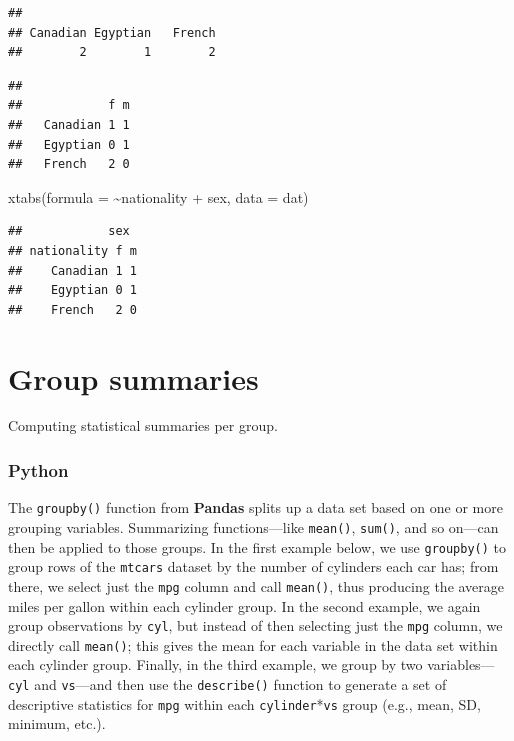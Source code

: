 \documentclass[
]{book}
\newenvironment{Shaded}{\begin{snugshade}}{\end{snugshade}}
\newcommand{\AttributeTok}[1]{\textcolor[rgb]{0.77,0.63,0.00}{#1}}
\newcommand{\FunctionTok}[1]{\textcolor[rgb]{0.00,0.00,0.00}{#1}}
\newcommand{\NormalTok}[1]{#1}
\newcommand{\SpecialCharTok}[1]{\textcolor[rgb]{0.00,0.00,0.00}{#1}}
\begin{document}
\begin{verbatim}
## 
## Canadian Egyptian   French 
##        2        1        2
\end{verbatim}

\begin{Shaded}
\end{Shaded}

\begin{verbatim}
##           
##            f m
##   Canadian 1 1
##   Egyptian 0 1
##   French   2 0
\end{verbatim}

\begin{Shaded}
\begin{Highlighting}[]
\FunctionTok{xtabs}\NormalTok{(}\AttributeTok{formula =} \SpecialCharTok{\textasciitilde{}}\NormalTok{nationality }\SpecialCharTok{+}\NormalTok{ sex, }\AttributeTok{data =}\NormalTok{ dat)}
\end{Highlighting}
\end{Shaded}

\begin{verbatim}
##            sex
## nationality f m
##    Canadian 1 1
##    Egyptian 0 1
##    French   2 0
\end{verbatim}

\hypertarget{group-summaries}{%
\section{Group summaries}\label{group-summaries}}

Computing statistical summaries per group.

\hypertarget{python-39}{%
\subsubsection*{Python}\label{python-39}}

The \texttt{groupby()} function from \textbf{Pandas} splits up a data set based on one or more grouping variables. Summarizing functions---like \texttt{mean()}, \texttt{sum()}, and so on---can then be applied to those groups. In the first example below, we use \texttt{groupby()} to group rows of the \texttt{mtcars} dataset by the number of cylinders each car has; from there, we select just the \texttt{mpg} column and call \texttt{mean()}, thus producing the average miles per gallon within each cylinder group. In the second example, we again group observations by \texttt{cyl}, but instead of then selecting just the \texttt{mpg} column, we directly call \texttt{mean()}; this gives the mean for each variable in the data set within each cylinder group. Finally, in the third example, we group by two variables---\texttt{cyl} and \texttt{vs}---and then use the \texttt{describe()} function to generate a set of descriptive statistics for \texttt{mpg} within each \texttt{cylinder}*\texttt{vs} group (e.g., mean, SD, minimum, etc.).
\end{document}
